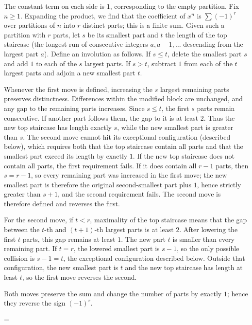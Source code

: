 \documentclass[11pt]{article}
\makeatletter
\theoremstyle{ntstyle}
\let\nt@closedisplay\]
\def\nt@guardedclose{\@ifnextchar\par{\nt@closeafterpar}{\@ifnextchar\end{\postdisplaypenalty\@M\nt@closedisplay}{\nt@closedisplay}}}
\def\nt@closeafterpar\par{\@ifnextchar\par{\nt@closeafterpar}{\@ifnextchar\end{\postdisplaypenalty\@M\nt@closedisplay\par}{\nt@closedisplay\par}}}
\renewenvironment{proof}[1][\proofname]{\par
  \pushQED{\qed}\normalfont\topsep\medskipamount\edef\nt@afterproof{\@endparpenalty=\the\@endparpenalty\relax}\@beginparpenalty\@M\@endparpenalty\@M\let\]\nt@guardedclose\trivlist\item[]\textit{#1\@addpunct{.}} \ignorespaces}{\ifvmode\addpenalty\@M\fi\popQED\nt@afterproof\endtrivlist\@endpefalse}
\makeatother
\begin{document}
\begin{proof} The constant term on each side is $1$, corresponding to
	the empty partition. Fix $n\ge1$. Expanding the product, we find that the coefficient
	of $x^n$ is $\sum(-1)^r$ over partitions of $n$ into $r$ distinct parts;
	this is a finite sum. Given such a partition with $r$ parts, let $s$ be its smallest
	part and $t$ the length of the top staircase (the
	longest run of consecutive integers $a,a-1,\ldots$ descending from the
	largest part $a$). Define an involution as follows. If $s\le t$,
	delete the smallest part $s$ and add $1$ to each of the $s$ largest
	parts. If $s>t$, subtract $1$ from each of the $t$ largest
	parts and adjoin a new smallest part $t$.

	Whenever the first move is defined, increasing the $s$ largest
	remaining parts preserves distinctness. Differences within the
	modified block are unchanged, and any gap to the remaining parts
	increases. Since $s\le t$, the first $s$ parts remain consecutive.
	If another part follows them, the gap to it is at least $2$.
	Thus the new top staircase has length exactly $s$, while the new
	smallest part is greater than $s$. The second move cannot hit its
	exceptional configuration (described below), which requires both that the
	top staircase contain all parts and that the smallest part exceed its
	length by exactly $1$. If the new top staircase does not contain
	all parts, the first requirement fails. If it does contain
	all $r-1$ parts, then $s=r-1$, so every remaining part was increased
	in the first move; the new smallest part is therefore the original
	second-smallest part plus $1$, hence strictly greater than $s+1$, and
	the second requirement fails. The second move is therefore
	defined and reverses the first.

	For the second move, if $t<r$, maximality of the top staircase
	means that the gap between the $t$-th and $(t+1)$-th largest parts
	is at least $2$. After lowering the first $t$ parts, this gap
	remains at least $1$. The new part $t$ is smaller than every
	remaining part. If $t=r$, the lowered smallest part is $s-1$,
	so the only possible collision is $s-1=t$, the exceptional
	configuration described below. Outside that configuration, the
	new smallest part is $t$ and the new top staircase has length
	at least $t$, so the first move reverses the second.

	Both moves preserve the sum and change the number of parts by exactly $1$; hence they reverse the sign $(-1)^r$.


\end{proof}
\end{document}
